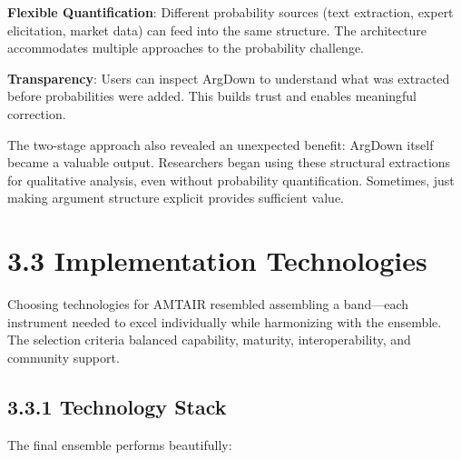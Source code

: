 \documentclass[
  11pt,
  letterpaper,
]{book}
\begin{document}
\textbf{Flexible Quantification}: Different probability sources (text
extraction, expert elicitation, market data) can feed into the same
structure. The architecture accommodates multiple approaches to the
probability challenge.

\textbf{Transparency}: Users can inspect ArgDown to understand what was
extracted before probabilities were added. This builds trust and enables
meaningful correction.

The two-stage approach also revealed an unexpected benefit: ArgDown
itself became a valuable output. Researchers began using these
structural extractions for qualitative analysis, even without
probability quantification. Sometimes, just making argument structure
explicit provides sufficient value.

\section{3.3 Implementation Technologies}\label{sec-implementation-tech}

Choosing technologies for AMTAIR resembled assembling a band---each
instrument needed to excel individually while harmonizing with the
ensemble. The selection criteria balanced capability, maturity,
interoperability, and community support.

\subsection{3.3.1 Technology Stack}\label{sec-tech-stack}

The final ensemble performs beautifully:
\end{document}

